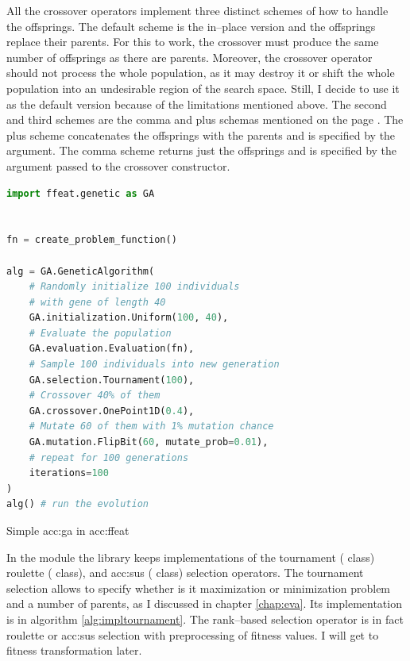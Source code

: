 All the crossover operators implement three distinct schemes of how to handle the offsprings. The default scheme is the in--place version and the offsprings replace their parents. For this to work, the crossover must produce the same number of offsprings as there are parents. Moreover, the crossover operator should not process the whole population, as it may destroy it or shift the whole population into an undesirable region of the search space. Still, I decide to use it as the default version because of the \gpu limitations mentioned above.
The second and third schemes are the comma and plus schemas mentioned on the page \pageref{enum:steadystate}. The plus scheme concatenates the offsprings with the parents and is specified by the  argument. The comma scheme returns just the offsprings and is specified by the  argument passed to the crossover constructor.

\begin{algorithm}[b!]
\begin{lstlisting}[language=Python, xrightmargin=18pt]
import ffeat.genetic as GA


fn = create_problem_function()

alg = GA.GeneticAlgorithm(
    # Randomly initialize 100 individuals 
    # with gene of length 40
    GA.initialization.Uniform(100, 40),
    # Evaluate the population
    GA.evaluation.Evaluation(fn),
    # Sample 100 individuals into new generation
    GA.selection.Tournament(100),
    # Crossover 40% of them
    GA.crossover.OnePoint1D(0.4),
    # Mutate 60 of them with 1% mutation chance
    GA.mutation.FlipBit(60, mutate_prob=0.01),
    # repeat for 100 generations
    iterations=100
)
alg() # run the evolution
\end{lstlisting}
\caption{Simple \acrshort*{acc:ga} in \acrshort*{acc:ffeat}}
\label{alg:gaffeat}
\end{algorithm}

In the  module the library keeps implementations of the 
tournament ( class)
roulette ( class), 
and \acrlong{acc:sus} ( class)
selection operators. The tournament selection allows to specify whether is it maximization or minimization problem and a number of parents, as I discussed in chapter \ref{chap:eva}. Its implementation is in algorithm \ref{alg:impltournament}. The rank--based selection operator is in fact roulette or \acrshort{acc:sus} selection with preprocessing of fitness values. I will get to fitness transformation later.

